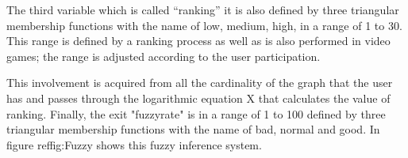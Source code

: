 The third variable which is called “ranking” it is also defined by three triangular membership functions with the name of low, medium, high, in a range of 1 to 30. This range is defined by a ranking process as well as is also performed in video games; the range is adjusted according to the user participation.

This involvement is acquired from all the cardinality of the graph that the user has and passes through the logarithmic equation X that calculates the value of ranking. Finally, the exit "fuzzyrate" is in a range of 1 to 100 defined by three triangular membership functions with the name of bad, normal and good. In figure ref{fig:Fuzzy} shows this fuzzy inference system.


\begin{enumerate} 


\end{enumerate}
